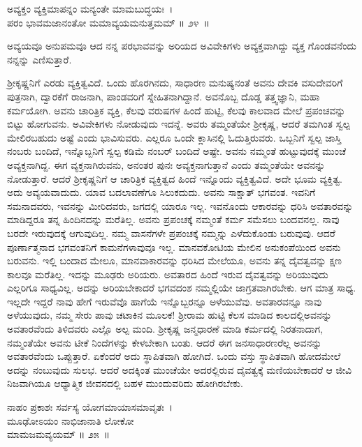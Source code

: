 \begin{shloka}
ಅವ್ಯಕ್ತಂ ವ್ಯಕ್ತಿಮಾಪನ್ನಂ ಮನ್ಯಂತೇ ಮಾಮಬುದ್ಧಯಃ~।\\ಪರಂ ಭಾವಮಜಾನಂತೋ ಮಮಾವ್ಯಯಮನುತ್ತಮಮ್ \hfill॥ ೨೪~॥
\end{shloka}

\begin{artha}
ಅವ್ಯಯವೂ ಅನುಪಮವೂ ಆದ ನನ್ನ ಪರಭಾವವನ್ನು ಅರಿಯದ ಅವಿವೇಕಿಗಳು ಅವ್ಯಕ್ತವಾಗಿದ್ದು ವ್ಯಕ್ತ ಗೊಂಡವನೆಂದು ನನ್ನನ್ನು ಎಣಿಸುತ್ತಾರೆ.
\end{artha}

ಶ‍್ರೀಕೃಷ್ಣನಿಗೆ ಎರಡು ವ್ಯಕ್ತಿತ್ವವಿದೆ. ಒಂದು ಹೊರಗಿನದು, ಸಾಧಾರಣ ಮನುಷ್ಯನಂತೆ ಅವನು ದೇವಕಿ ವಸುದೇವರಿಗೆ ಪುತ್ರನಾಗಿ, ದ್ವಾರಕೆಗೆ ರಾಜನಾಗಿ, ಪಾಂಡವರಿಗೆ ಸ್ನೇಹಿತನಾಗಿದ್ದಾನೆ. ಅವನೊಬ್ಬ ದೊಡ್ಡ ತತ್ತ್ವಜ್ಞಾನಿ, ಮಹಾ ಕರ್ಮಯೋಗಿ. ಅವನು ಚಾರಿತ್ರಿಕ ವ್ಯಕ್ತಿ, ಕೆಲವು ವರುಷಗಳ ಹಿಂದೆ ಹುಟ್ಟಿ, ಕೆಲವು ಕಾಲವಾದ ಮೇಲೆ ಪ್ರಪಂಚವನ್ನು ಬಿಟ್ಟು ಹೋಗುವನು. ಅವಿವೇಕಿಗಳು ನೋಡುವುದು ಇದನ್ನೆ. ಅವರು ತಮ್ಮಂತೆಯೇ ಶ‍್ರೀಕೃಷ್ಣ, ಆದರೆ ತಮಗಿಂತ ಸ್ವಲ್ಪ ಮೇಲಿರಬಹುದು ಅಷ್ಟೆ ಎಂದು ಭಾವಿಸುವರು. ಎಲ್ಲರೂ ಒಂದೇ ಕ್ಲಾಸಿನಲ್ಲಿ ಓದುತ್ತಿರುವರು. ಒಬ್ಬನಿಗೆ ಸ್ವಲ್ಪ ಜಾಸ್ತಿ ನಂಬರು ಬಂದಿದೆ, ಇನ್ನೊಬ್ಬನಿಗೆ ಸ್ವಲ್ಪ ಕಡಿಮೆ ನಂಬರ್ ಬಂದಿದೆ ಅಷ್ಟೇ. ಅವನು ನಮ್ಮಂತೆ ಹುಟ್ಟುವುದಕ್ಕೆ ಮುಂಚೆ ಅವ್ಯಕ್ತನಾಗಿದ್ದ. ಈಗ ವ್ಯಕ್ತನಾಗಿರುವನು, ಅನಂತರ ಪುನಃ ಅವ್ಯಕ್ತನಾಗುತ್ತಾನೆ ಎಂದು ತಮ್ಮಂತೆಯೇ ಅವನನ್ನು ನೋಡುತ್ತಾರೆ. ಆದರೆ ಶ‍್ರೀಕೃಷ್ಣನಿಗೆ ಆ ಚಾರಿತ್ರಿಕ ವ್ಯಕ್ತಿತ್ವದ ಹಿಂದೆ ಇನ್ನೊಂದು ವ್ಯಕ್ತಿತ್ವವಿದೆ. ಅದೇ ಭೂಮ ವ್ಯಕ್ತಿತ್ವ. ಅದು ಅವ್ಯಯವಾದುದು. ಯಾವ ಬದಲಾವಣೆಗೂ ಸಿಲುಕದುದು. ಅವನು ಸಾಕ್ಷಾತ್ ಭಗವಂತ. ಇವನಿಗೆ ಸಮನಾದವರು, ಇವನನ್ನು ಮೀರಿದವರು, ಜಗದಲ್ಲಿ ಯಾರೂ ಇಲ್ಲ. ಇವನೊಂದು ಆಕಾರವನ್ನು ಧರಿಸಿ ಅವತಾರವನ್ನು ಮಾಡಿದ್ದರೂ ತನ್ನ ಹಿಂದಿನದನ್ನು ಮರೆತಿಲ್ಲ. ಅವನು ಪ್ರಪಂಚಕ್ಕೆ ನಮ್ಮಂತೆ ಕರ್ಮ ಸಮೆಸಲು ಬಂದವನಲ್ಲ. ನಾವು ಬರದೇ ಇರುವುದಕ್ಕೆ ಆಗುವುದಿಲ್ಲ. ನಮ್ಮ ವಾಸನೆಗಳೇ ಪ್ರಪಂಚಕ್ಕೆ ನಮ್ಮನ್ನು ಎಳೆದುಕೊಂಡು ಬರುವುವು. ಆದರೆ ಪೂರ್ಣಾತ್ಮನಾದ ಭಗವಂತನಿಗೆ ಕಾಮನೆಗಳಾವುವೂ ಇಲ್ಲ. ಮಾನವಕೋಟಿಯ ಮೇಲಿನ ಅನುಕಂಪೆಯಿಂದ ಅವನು ಬರುವನು. ಇಲ್ಲಿ ಬಂದಾದ ಮೇಲೂ, ಮಾನವಾಕಾರವನ್ನು ಧರಿಸಿದ ಮೇಲೆಯೂ, ಅವನು ತನ್ನ ದೈವತ್ವವನ್ನು ಕ್ಷಣ ಕಾಲವೂ ಮರೆತಿಲ್ಲ. ಇದನ್ನು ಮೂಢರು ಅರಿಯರು. ಅವತಾರದ ಹಿಂದೆ ಇರುವ ದೈವತ್ವವನ್ನು ಅರಿಯುವುದು ಎಲ್ಲರಿಗೂ ಸಾಧ್ಯವಿಲ್ಲ. ಅದನ್ನು ಅರಿಯಬೇಕಾದರೆ ಭಗವದಂಶ ನಮ್ಮಲ್ಲಿಯೇ ಜಾಗ್ರತವಾಗಿರಬೇಕು. ಆಗ ಮಾತ್ರ ಸಾಧ್ಯ. ಇಲ್ಲದೇ ಇದ್ದರೆ ನಾವು ಹೇಗೆ ಇರುವೆವೊ ಹಾಗೆಯೆ ಇನ್ನೊಬ್ಬರನ್ನೂ ಅಳೆಯುವೆವು. ಅವತಾರವನ್ನೂ ನಾವು ಅಳೆಯುವುದು, ನಮ್ಮ ಸೇರು ಪಾವು ಚಟಾಕಿನ ಮೂಲಕ! ಶ‍್ರೀರಾಮ ಹುಟ್ಟಿ ಕೆಲಸ ಮಾಡಿದ ಕಾಲದಲ್ಲಿ\break ಅವನನ್ನು ಅವತಾರವೆಂದು ತಿಳಿದವರು ಎಲ್ಲೊ ಅಲ್ಪ ಮಂದಿ. ಶ‍್ರೀಕೃಷ್ಣ ಜನ್ಮಧಾರಣೆ ಮಾಡಿ ಕರ್ಮದಲ್ಲಿ ನಿರತನಾದಾಗ, ನಮ್ಮಂತೆಯೇ ಅವನು ಟೀಕೆ ನಿಂದೆಗಳನ್ನು ಕೇಳಬೇಕಾಗಿ ಬಂತು. ಆದರೆ ಈಗ ಜನಸಾಧಾರಣರೆಲ್ಲ ಅವನನ್ನು ಅವತಾರವೆಂದು ಒಪ್ಪುತ್ತಾರೆ. ಏಕೆಂದರೆ ಅದು ಸ್ಥಾಪಿತವಾಗಿ ಹೋಗಿದೆ. ಒಂದು ವಸ್ತು ಸ್ಥಾಪಿತವಾಗಿ ಹೋದಮೇಲೆ ಅದನ್ನು ನಂಬುವುದು ಸುಲಭ. ಆದರೆ ಅದಕ್ಕಿಂತ ಮುಂಚೆಯೇ ಅದರಲ್ಲಿರುವ ದೈವತ್ವಕ್ಕೆ ಮಣಿಯಬೇಕಾದರೆ ಆ ಜೀವಿ ನಿಜವಾಗಿಯೂ ಆಧ್ಯಾತ್ಮಿಕ ಜೀವನದಲ್ಲಿ ಬಹಳ ಮುಂದುವರಿದು ಹೋಗಿರಬೇಕು.

\begin{shloka}
ನಾಹಂ ಪ್ರಕಾಶಃ ಸರ್ವಸ್ಯ ಯೋಗಮಾಯಾಸಮಾವೃತಃ~।\\ಮೂಢೋಽಯಂ ನಾಭಿಜಾನಾತಿ ಲೋಕೋ\\ ಮಾಮಜಮವ್ಯಯಮ್ \hfill॥ ೨೫~॥
\end{shloka}

